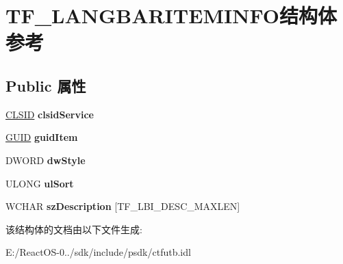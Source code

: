\hypertarget{struct_t_f___l_a_n_g_b_a_r_i_t_e_m_i_n_f_o}{}\section{T\+F\+\_\+\+L\+A\+N\+G\+B\+A\+R\+I\+T\+E\+M\+I\+N\+F\+O结构体 参考}
\label{struct_t_f___l_a_n_g_b_a_r_i_t_e_m_i_n_f_o}
\subsection*{Public 属性}
\begin{DoxyCompactItemize}
\item 
\mbox{\label{struct_t_f___l_a_n_g_b_a_r_i_t_e_m_i_n_f_o_a796cbac2cf6e4c8bff5635890a4566a6}} 
\hyperlink{struct___i_i_d}{C\+L\+S\+ID} {\bfseries clsid\+Service}
\item 
\mbox{\label{struct_t_f___l_a_n_g_b_a_r_i_t_e_m_i_n_f_o_ae2b0989e23fafa2204e8625ab382698c}} 
\hyperlink{interface_g_u_i_d}{G\+U\+ID} {\bfseries guid\+Item}
\item 
\mbox{\label{struct_t_f___l_a_n_g_b_a_r_i_t_e_m_i_n_f_o_a7e6f3f99e51efb26a89ad10a2b2300f3}} 
D\+W\+O\+RD {\bfseries dw\+Style}
\item 
\mbox{\label{struct_t_f___l_a_n_g_b_a_r_i_t_e_m_i_n_f_o_a3757059d5bfb6cda62c7bd90a3852daf}} 
U\+L\+O\+NG {\bfseries ul\+Sort}
\item 
\mbox{\label{struct_t_f___l_a_n_g_b_a_r_i_t_e_m_i_n_f_o_a018e47461cfa6e3a64ab0106ad6e8a08}} 
W\+C\+H\+AR {\bfseries sz\+Description} \mbox{[}T\+F\+\_\+\+L\+B\+I\+\_\+\+D\+E\+S\+C\+\_\+\+M\+A\+X\+L\+EN\mbox{]}
\end{DoxyCompactItemize}


该结构体的文档由以下文件生成\+:\begin{DoxyCompactItemize}
\item 
E\+:/\+React\+O\+S-\/0../sdk/include/psdk/ctfutb.\+idl\end{DoxyCompactItemize}
